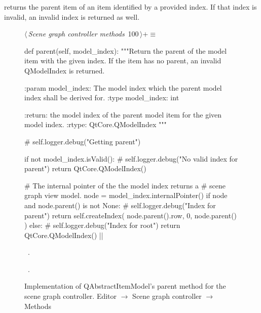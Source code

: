 \documentclass[%
    a4paper,    %
    justified,  %
    nobib,      %
    openany     %
]{tufte-book}
\makeatletter
\renewcommand{\label}[1]{\@tufte@label{##1}}%
\makeatother
\begin{document}
 returns the parent item of an item identified by
a provided index. If that index is invalid, an invalid index is returned as
well.

\begin{figure}[!htbp]
\begin{flushleft} \small
\begin{minipage}{\linewidth}\label{scrap31}\raggedright\small
{} $\langle\,${\itshape Scene graph controller methods}\nobreak\ {\footnotesize {100}}$\,\rangle+\equiv$
\vspace{-1ex}
\begin{pythoncode}
def parent(self, model_index):
    """Return the parent of the model item with the given index.
    If the item has no parent, an invalid QModelIndex is returned.

    :param model_index: The model index which the parent model
                        index shall be derived for.
    :type model_index:  int

    :return: the model index of the parent model item for the
             given model index.
    :rtype:  QtCore.QModelIndex
    """

    # self.logger.debug("Getting parent")

    if not model_index.isValid():
        # self.logger.debug("No valid index for parent")
        return QtCore.QModelIndex()

    # The internal pointer of the the model index returns a
    # scene graph view model.
    node = model_index.internalPointer()
    if node and node.parent() is not None:
        # self.logger.debug("Index for parent")
        return self.createIndex(
            node.parent().row, 0, node.parent()
        )
    else:
        # self.logger.debug("Index for root")
        return QtCore.QModelIndex()
|\NWsep|
\end{pythoncode}
\vspace{1.5ex}
\footnotesize
\begin{list}{}{\setlength{\itemsep}{-\parsep}\setlength{\itemindent}{-\leftmargin}}
\item \NWtxtMacroDefBy\ .
\item \NWtxtMacroRefIn\ .

\item{}
\end{list}
\end{minipage}\vspace{4ex}
\end{flushleft}
\caption{Implementation of QAbstractItemModel's parent method for the scene graph
  controller.
  \newline{}\newline{}Editor $\rightarrow$ Scene graph controller $\rightarrow$
  Methods}
\end{figure}
\end{document}
